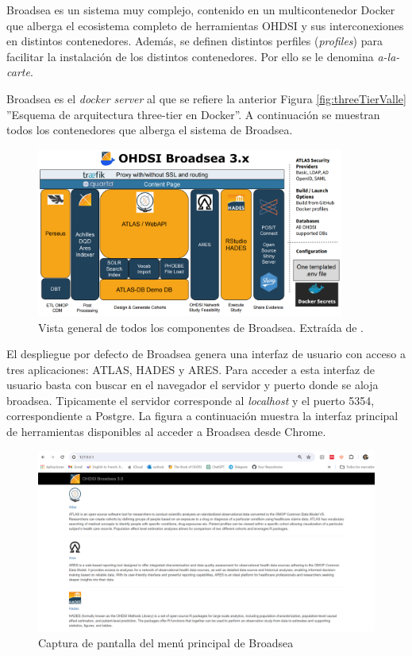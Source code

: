 Broadsea es un sistema muy complejo, contenido en un multicontenedor Docker que alberga el ecosistema completo de herramientas OHDSI y sus interconexiones en distintos contenedores. Además, se definen distintos perfiles (\textit{profiles}) para facilitar la instalación de los distintos contenedores. Por ello se le denomina \textit{a-la-carte}. 

Broadsea es el \textit{docker server} al que se refiere la anterior Figura \ref{fig:threeTierValle} ''Esquema de arquitectura three-tier en Docker''. A continuación se muestran todos los contenedores que alberga el sistema de Broadsea.

\begin{figure}[H]
    \centering
    \includegraphics[width=0.90\textwidth]{figures/OHDSIBroadsea3.0.png}
    \caption{Vista general de todos los componentes de Broadsea. Extraída de \cite{Broadsea3PPTX}.}
    \label{fig:OHDSIBroadsea3.0}
\end{figure}

El despliegue por defecto de Broadsea genera una interfaz de usuario con acceso a tres aplicaciones: ATLAS, HADES y ARES. Para acceder a esta interfaz de usuario basta con buscar en el navegador el servidor y puerto donde se aloja broadsea. Tipicamente el servidor corresponde al \textit{localhost} y el puerto 5354, correspondiente a Postgre. La figura a continuación muestra la interfaz principal de herramientas disponibles al acceder a Broadsea desde Chrome.

\begin{figure}[H]
    \centering
    \includegraphics[width=1\textwidth]{figures/homeBroadsea.png}
    \caption{Captura de pantalla del menú principal de Broadsea}
    \label{fig:homeBroadsea}
\end{figure}

